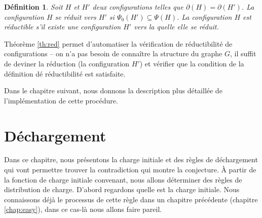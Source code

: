 \documentclass[10pt,a4paper]{article}
\newtheorem{definition}{Définition}
\newtheorem{proposition}{Proposition}
\begin{document}

\begin{definition}
Soit $H$ et $H'$ deux configurations telles que $\partial(H)=\partial(H')$. La configuration $H$ \emph{se réduit} vers $H'$ si $\Psi_0(H')\subseteq \Psi(H)$. La configuration $H$ est \emph{réductible} s'il existe une configuration $H'$ vers la quelle elle se réduit.
\end{definition}

Théorème \ref{th:red} permet d'automatiser la vérification de réductibilité de configurations -- on n'a pas besoin de connaître la structure du graphe $G$, il suffit de deviner la réduction (la configuration $H'$) et vérifier que la condition de la définition dé réductibilité est satisfaite.

Dans le chapitre suivant, nous donnons la description plus détaillée de l'implémentation de cette procédure.



\section{Déchargement}
\label{chap:Dec}
Dans ce chapitre, nous présentons la charge initiale et des règles de déchargement qui vont permettre trouver la contradiction qui montre la conjecture. \` A partir de la fonction de charge initiale convenant, nous allons déterminer des règles de distribution de charge. D'abord regardons quelle est la charge initiale. Nous connaissons déjà le processus de cette règle dans un chapitre précédente (chapitre \ref{chap:easy}), dans ce cas-là nous allons faire pareil.
\end{document}
